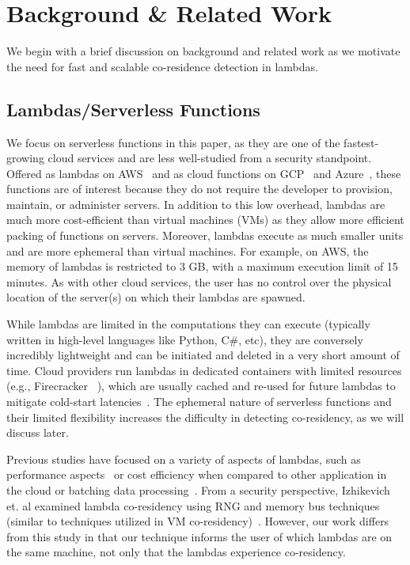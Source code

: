 \section{Background \& Related Work}
\label{sec:background}

We begin with a brief discussion on background and related work as we motivate
the need for fast and scalable co-residence detection in lambdas.

\subsection{Lambdas/Serverless Functions} 
\label{sec:background:lambdas}

We focus on serverless functions in this paper, as they are one of the
fastest-growing cloud services and are less well-studied from a security
standpoint. Offered as lambdas on AWS~\cite{awslambda} and as cloud functions
on GCP~\cite{gcpfunctions} and Azure~\cite{azurefunctions}, these functions are
of interest because they do not require the developer to provision, maintain, or
administer servers. In addition to this low overhead, lambdas are much more
cost-efficient than virtual machines (VMs) as they allow more efficient packing
of functions on servers. Moreover, lambdas execute as much smaller units  and
are more ephemeral than virtual machines.  For example, on AWS,
the memory of lambdas is restricted to 3 GB, with a maximum execution limit of 15
minutes.  As with other cloud services, the user has no control over the
physical location of the server(s) on which their lambdas are spawned.

While lambdas are limited in the computations they can execute (typically
written in high-level languages like Python, C\#, etc), they are conversely
incredibly lightweight and can be initiated and deleted in a very short amount
of time. Cloud providers run lambdas in dedicated containers with limited
resources (e.g., Firecracker ~\cite{firecracker}), which are usually cached and
re-used for future lambdas to mitigate cold-start
latencies~\cite{awscontainerreuse}. The ephemeral nature of serverless functions
and their limited flexibility increases the difficulty in detecting
co-residency, as we will discuss later. 

Previous studies have focused on a variety of aspects of lambdas, such as
performance aspects~\cite{wangusenix2018} or cost efficiency when compared to
other application in the cloud or batching data processing~\cite{villamizar2016,
kiran2015}. From a security perspective, Izhikevich et.  al examined lambda
co-residency using RNG and memory bus techniques (similar to techniques utilized
in VM co-residency)~\cite{izhikevich2018}. However, our work differs from this
study in that our technique informs the user of which lambdas are on the same
machine, not only that the lambdas experience co-residency.

